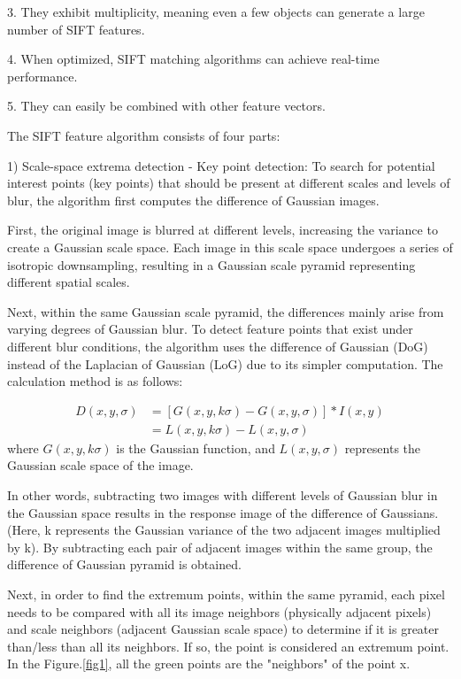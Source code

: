 \documentclass[10pt,twocolumn,letterpaper]{article}
\begin{document}
3. They exhibit multiplicity, meaning even a few objects can generate a large number of SIFT features.

4. When optimized, SIFT matching algorithms can achieve real-time performance.

5. They can easily be combined with other feature vectors.

The SIFT feature algorithm consists of four parts:

1) Scale-space extrema detection - Key point detection:
To search for potential interest points (key points) that should be present at different scales and levels of blur, the algorithm first computes the difference of Gaussian images.

First, the original image is blurred at different levels, increasing the variance to create a Gaussian scale space. Each image in this scale space undergoes a series of isotropic downsampling, resulting in a Gaussian scale pyramid representing different spatial scales.

Next, within the same Gaussian scale pyramid, the differences mainly arise from varying degrees of Gaussian blur. To detect feature points that exist under different blur conditions, the algorithm uses the difference of Gaussian (DoG) instead of the Laplacian of Gaussian (LoG) due to its simpler computation. The calculation method is as follows: 



\begin{align}
	D(x,y,\sigma)
	& = [G(x,y,k\sigma)-G(x,y,\sigma)]*I(x,y)\\
	& = L(x,y,k\sigma)-L(x,y,\sigma)
\end{align}
where $G(x,y,k\sigma)$ is the Gaussian function, and $L(x,y,\sigma)$ represents the Gaussian scale space of the image.

In other words, subtracting two images with different levels of Gaussian blur in the Gaussian space results in the response image of the difference of Gaussians. (Here, k represents the Gaussian variance of the two adjacent images multiplied by k). By subtracting each pair of adjacent images within the same group, the difference of Gaussian pyramid is obtained.

Next, in order to find the extremum points, within the same pyramid, each pixel needs to be compared with all its image neighbors (physically adjacent pixels) and scale neighbors (adjacent Gaussian scale space) to determine if it is greater than/less than all its neighbors. If so, the point is considered an extremum point. In the Figure.\ref{fig1}, all the green points are the "neighbors" of the point x.
\end{document}
